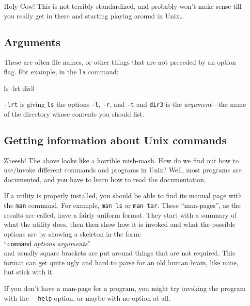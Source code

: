 \documentclass[]{krantz}
\makeatletter
\newenvironment{Shaded}{\begin{snugshade}}{\end{snugshade}}
\newcommand{\FunctionTok}[1]{\textcolor[rgb]{0,0,0}{#1}}
\newcommand{\NormalTok}[1]{#1}
\newenvironment{kframe}{%
\medskip{}
\setlength{\fboxsep}{.8em}
 \def\at@end@of@kframe{}%
 \ifinner\ifhmode%
  \def\at@end@of@kframe{\end{minipage}}%
  \begin{minipage}{\columnwidth}%
 \fi\fi%
 \def\FrameCommand##1{\hskip\@totalleftmargin \hskip-\fboxsep
 \colorbox{shadecolor}{##1}\hskip-\fboxsep
     \hskip-\linewidth \hskip-\@totalleftmargin \hskip\columnwidth}%
 \MakeFramed {\advance\hsize-\width
   \@totalleftmargin\z@ \linewidth\hsize
   \@setminipage}}%
 {\par\unskip\endMakeFramed%
 \at@end@of@kframe}
\renewenvironment{Shaded}{\begin{kframe}}{\end{kframe}}
\makeatother
\begin{document}
Holy Cow! This is not terribly standardized, and probably won't make sense till
you really get in there and starting playing around in Unix\ldots{}

\hypertarget{arguments}{%
\subsection{Arguments}\label{arguments}}

These are often file names, or other things that are not preceded by an option flag.
For example, in the \texttt{ls} command:

\begin{Shaded}
\begin{Highlighting}[]
\FunctionTok{ls}\NormalTok{ -lrt dir3}
\end{Highlighting}
\end{Shaded}

\texttt{-lrt} is giving \texttt{ls} the options \texttt{-l}, \texttt{-r}, and \texttt{-t} and \texttt{dir3} is the \emph{argument}---the
name of the directory whose contents you should list.

\hypertarget{getting-information-about-unix-commands}{%
\subsection{Getting information about Unix commands}\label{getting-information-about-unix-commands}}

Zheesh! The above looks like a horrible mish-mash. How do we find out
how to use/invoke different commands and programs in Unix? Well, most
programs are documented, and you have to learn how to read the documentation.

If a utility is properly installed, you should be able to find its manual page with
the \texttt{man} command. For example, \texttt{man\ ls} or \texttt{man\ tar}. These ``man-pages'', as the
results are called, have a fairly uniform format. They start with a summary of what the
utility does, then then show how it is invoked and what the possible options are by
showing a skeleton in the form:\\
``\texttt{command} \emph{options} \emph{arguments}''\\
and usually square brackets are put around things that are not required. This format
can get quite ugly and hard to parse for an old human brain, like mine, but stick with it.

If you don't have a man-page for a program, you might try invoking the program with
the \texttt{-\/-help} option, or maybe with no option at all.
\end{document}
